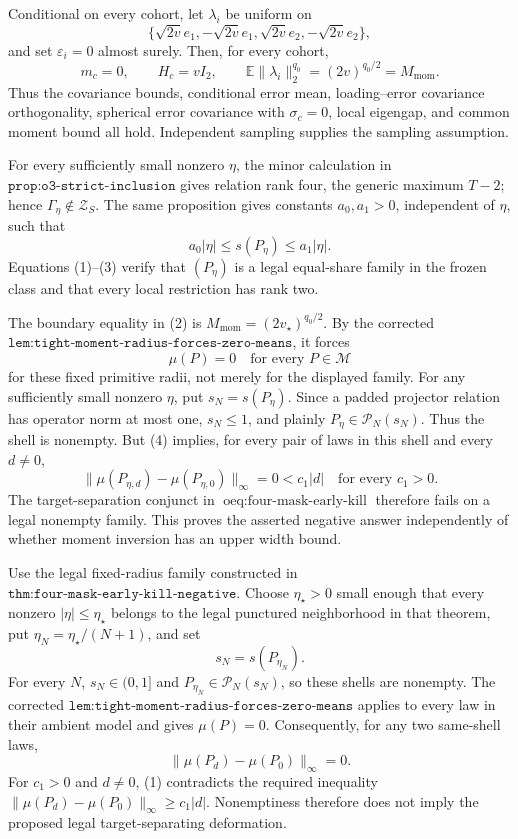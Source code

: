 Conditional on every cohort, let \(\lambda_i\) be uniform on
\[
\{\sqrt{2v}e_1,-\sqrt{2v}e_1,
\sqrt{2v}e_2,-\sqrt{2v}e_2\},
\]
and set \(\varepsilon_i=0\) almost surely. Then, for every cohort,
\[
m_c=0,
\qquad
H_c=vI_2,
\qquad
\mathbb E\|\lambda_i\|_2^{q_0}=(2v)^{q_0/2}=M_{\mathrm{mom}}.
\tag{2}
\]
Thus the covariance bounds, conditional error mean, loading--error covariance orthogonality, spherical error covariance with \(\sigma_c=0\), local eigengap, and common moment bound all hold. Independent sampling supplies the sampling assumption.

For every sufficiently small nonzero \(\eta\), the minor calculation in \(\texttt{prop:o3-strict-inclusion}\) gives relation rank four, the generic maximum \(T-2\); hence \(\Gamma_\eta\notin\mathcal Z_S\). The same proposition gives constants \(a_0,a_1>0\), independent of \(\eta\), such that
\[
a_0|\eta|\leq s(P_\eta)\leq a_1|\eta|.
\tag{3}
\]
Equations (1)--(3) verify that \((P_\eta)\) is a legal equal-share family in the frozen class and that every local restriction has rank two.

The boundary equality in (2) is \(M_{\mathrm{mom}}=(2v_\star)^{q_0/2}\). By the corrected \(\texttt{lem:tight-moment-radius-forces-zero-means}\), it forces
\[
\mu(P)=0
\quad\text{for every }P\in\mathcal M
\tag{4}
\]
for these fixed primitive radii, not merely for the displayed family. For any sufficiently small nonzero \(\eta\), put \(s_N=s(P_\eta)\). Since a padded projector relation has operator norm at most one, \(s_N\leq1\), and plainly \(P_\eta\in\mathcal P_N(s_N)\). Thus the shell is nonempty. But (4) implies, for every pair of laws in this shell and every \(d\neq0\),
\[
\|\mu(P_{\eta,d})-\mu(P_{\eta,0})\|_\infty=0
<c_1|d|
\quad\text{for every }c_1>0.
\tag{5}
\]
The target-separation conjunct in \(\operatorname{oeq:four\text{-}mask\text{-}early\text{-}kill}\) therefore fails on a legal nonempty family. This proves the asserted negative answer independently of whether moment inversion has an upper width bound.

Use the legal fixed-radius family constructed in \(\texttt{thm:four-mask-early-kill-negative}\). Choose \(\eta_\star>0\) small enough that every nonzero \(|\eta|\leq\eta_\star\) belongs to the legal punctured neighborhood in that theorem, put \(\eta_N=\eta_\star/(N+1)\), and set
\[
s_N=s(P_{\eta_N}).
\]
For every \(N\), \(s_N\in(0,1]\) and \(P_{\eta_N}\in\mathcal P_N(s_N)\), so these shells are nonempty. The corrected \(\texttt{lem:tight-moment-radius-forces-zero-means}\) applies to every law in their ambient model and gives \(\mu(P)=0\). Consequently, for any two same-shell laws,
\[
\|\mu(P_d)-\mu(P_0)\|_\infty=0.
\tag{1}
\]
For \(c_1>0\) and \(d\neq0\), (1) contradicts the required inequality \(\|\mu(P_d)-\mu(P_0)\|_\infty\geq c_1|d|\). Nonemptiness therefore does not imply the proposed legal target-separating deformation.

